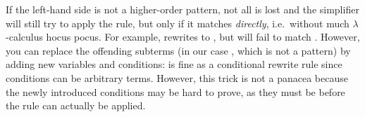 \begin{isabellebody}
\begin{isamarkuptext}
If the left-hand side is not a higher-order pattern, not all is lost
and the simplifier will still try to apply the rule, but only if it
matches \emph{directly}, i.e.\ without much $\lambda$-calculus hocus
pocus. For example,  rewrites
 to , but will fail to match
.  However, you can
replace the offending subterms (in our case , which
is not a pattern) by adding new variables and conditions:  is fine
as a conditional rewrite rule since conditions can be arbitrary
terms. However, this trick is not a panacea because the newly
introduced conditions may be hard to prove, as they must be
before the rule can actually be applied.
  

\end{isamarkuptext}
\end{isabellebody}
